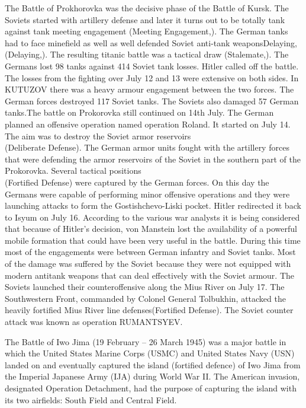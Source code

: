 \documentclass[]{article}
\begin{document}
The Battle of Prokhorovka was the decisive phase of the Battle of Kursk. The Soviets started with artillery defense and later it turns out to be totally tank against tank meeting engagement (\Gls{Meeting Engagement},). The German tanks had to face minefield as well as well defended Soviet anti-tank weapons\Gls{Delaying}, (\Gls{Delaying},). The resulting titanic battle was a tactical draw (\Gls{Stalemate},). The Germans lost 98 tanks against 414 Soviet tank losses. Hitler called off the battle. The losses from the fighting over July 12 and 13 were extensive on both sides. In KUTUZOV there was a heavy armour engagement between the two forces. The German forces destroyed 117 Soviet tanks. The Soviets also damaged 57 German tanks.The battle on Prokorovka still continued on 14th July. The German planned an offensive operation named operation Roland. It started on July 14. The aim was to destroy the Soviet armor reservoirs\\(\Gls{Deliberate Defense}). The German armor units fought with the artillery forces that were defending the armor reservoirs of the Soviet in the southern part of the Prokorovka. Several tactical positions\\ (\Gls{Fortified Defense}) were captured by the German forces. On this day the Germans were capable of performing minor offensive operations and they were launching attacks to form the Gostishchevo-Liski pocket. Hitler redirected it back to Isyum on July 16. According to the various war analysts it is being considered that because of Hitler's decision, von Manstein lost the availability of a powerful mobile formation that could have been very useful in the battle. During this time most of the engagements were between German infantry and Soviet tanks. Most of the damage was suffered by the Soviet because they were not equipped with modern antitank weapons that can deal effectively with the Soviet armour. The Soviets launched their counteroffensive along the Mius River on July 17. The Southwestern Front, commanded by Colonel General Tolbukhin, attacked the heavily fortified Mius River line defenses(\Gls{Fortified Defense}). The Soviet counter attack was known as operation RUMANTSYEV.

The Battle of Iwo Jima (19 February – 26 March 1945) was a major battle in which the United States Marine Corps (USMC) and United States Navy (USN) landed on and eventually captured the island (fortified defence) of Iwo Jima from the Imperial Japanese Army (IJA) during World War II. The American invasion, designated Operation Detachment, had the purpose of capturing the island with its two airfields: South Field and Central Field\cite{BattleOfIJ}.
\end{document}
